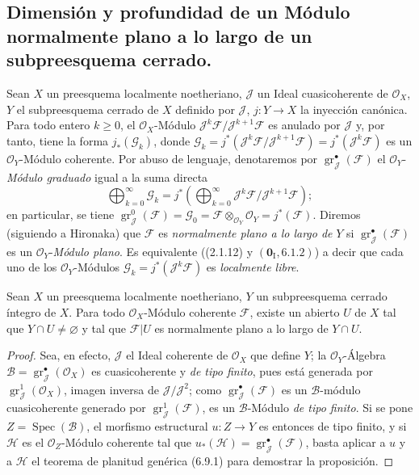 \subsection{Dimensión y profundidad de un Módulo normalmente plano a lo largo de un
subpreesquema cerrado.}
\label{subsection:IV.6.10}

\begin{env}[6.10.1]
Sean $X$ un preesquema localmente noetheriano, $\mathcal J$ un Ideal
cuasicoherente de $\mathcal O_X$, $Y$ el subpreesquema cerrado de $X$ definido
por $\mathcal J$, $j:Y\to X$ la inyección canónica. Para todo entero $k\geq0$,
el $\mathcal O_X$-Módulo
$\mathcal J^k\mathcal F/\mathcal J^{k+1}\mathcal F$ es anulado por
$\mathcal J$ y, por tanto, tiene la forma $j_*(\mathcal G_k)$, donde
$\mathcal G_k=j^*(\mathcal J^k\mathcal F/\mathcal J^{k+1}\mathcal F)=j^*(\mathcal J^k\mathcal F)$
es un $\mathcal O_Y$-Módulo coherente. Por abuso de lenguaje, denotaremos por
$\operatorname{gr}_{\mathcal J}^{\bullet}(\mathcal F)$ el
$\mathcal O_Y$-\emph{Módulo graduado} igual a la suma directa
\[
\bigoplus_{k=0}^{\infty}\mathcal G_k
=j^*\left(\bigoplus_{k=0}^{\infty}
\mathcal J^k\mathcal F/\mathcal J^{k+1}\mathcal F\right);
\]
en particular, se tiene
$\operatorname{gr}_{\mathcal J}^{0}(\mathcal F)=\mathcal G_0
=\mathcal F\otimes_{\mathcal O_Y}\mathcal O_Y=j^*(\mathcal F)$. Diremos
(siguiendo a Hironaka) que $\mathcal F$ es \emph{normalmente plano a lo largo de} $Y$ si
$\operatorname{gr}_{\mathcal J}^{\bullet}(\mathcal F)$ es un
$\mathcal O_Y$-\emph{Módulo plano}. Es equivalente ((2.1.12) y
$(\mathbf{0}_{\mathrm I},6.1.2)$) a decir que cada uno de los $\mathcal O_Y$-Módulos
$\mathcal G_k=j^*(\mathcal J^k\mathcal F)$ es \emph{localmente libre}.
\end{env}

\begin{proposition}[6.10.2]
\label{IV.2.s6.10.2-fr}
Sean $X$ un preesquema localmente noetheriano, $Y$ un subpreesquema cerrado
\textup{íntegro} de $X$. Para todo $\mathcal O_X$-Módulo coherente $\mathcal F$,
existe un abierto $U$ de $X$ tal que $Y\cap U\ne\varnothing$ y tal que
$\mathcal F|U$ es normalmente plano a lo largo de $Y\cap U$.
\end{proposition}

\begin{proof}
Sea, en efecto, $\mathcal J$ el Ideal coherente de $\mathcal O_X$ que define
$Y$; la $\mathcal O_Y$-Álgebra
$\mathcal B=\operatorname{gr}_{\mathcal J}^{\bullet}(\mathcal O_X)$ es
cuasicoherente y \emph{de tipo finito}, pues está generada por
$\operatorname{gr}_{\mathcal J}^{1}(\mathcal O_X)$, imagen inversa de
$\mathcal J/\mathcal J^2$; como
$\operatorname{gr}_{\mathcal J}^{\bullet}(\mathcal F)$ es un
$\mathcal B$-módulo cuasicoherente generado por
$\operatorname{gr}_{\mathcal J}^{1}(\mathcal F)$, es un
$\mathcal B$-Módulo \emph{de tipo finito}. Si se pone
$Z=\operatorname{Spec}(\mathcal B)$, el morfismo estructural $u:Z\to Y$ es
entonces de tipo finito, y si $\mathcal H$ es el $\mathcal O_Z$-Módulo coherente
tal que $u_*(\mathcal H)=\operatorname{gr}_{\mathcal J}^{\bullet}(\mathcal F)$,
basta aplicar a $u$ y a $\mathcal H$ el teorema de planitud
genérica (6.9.1) para demostrar la proposición.
\end{proof}
